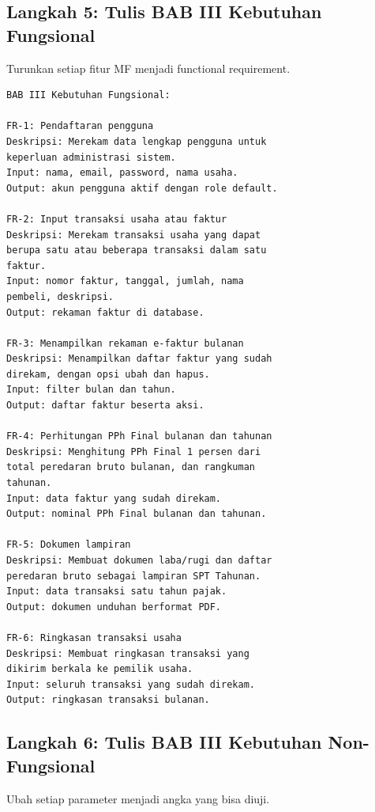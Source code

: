 \documentclass[11pt,a4paper]{article}
\begin{document}
\subsection{Langkah 5: Tulis BAB III Kebutuhan Fungsional}

Turunkan setiap fitur MF menjadi functional requirement.

\begin{lstlisting}[style=out]
BAB III Kebutuhan Fungsional:

FR-1: Pendaftaran pengguna
Deskripsi: Merekam data lengkap pengguna untuk
keperluan administrasi sistem.
Input: nama, email, password, nama usaha.
Output: akun pengguna aktif dengan role default.

FR-2: Input transaksi usaha atau faktur
Deskripsi: Merekam transaksi usaha yang dapat
berupa satu atau beberapa transaksi dalam satu
faktur.
Input: nomor faktur, tanggal, jumlah, nama
pembeli, deskripsi.
Output: rekaman faktur di database.

FR-3: Menampilkan rekaman e-faktur bulanan
Deskripsi: Menampilkan daftar faktur yang sudah
direkam, dengan opsi ubah dan hapus.
Input: filter bulan dan tahun.
Output: daftar faktur beserta aksi.

FR-4: Perhitungan PPh Final bulanan dan tahunan
Deskripsi: Menghitung PPh Final 1 persen dari
total peredaran bruto bulanan, dan rangkuman
tahunan.
Input: data faktur yang sudah direkam.
Output: nominal PPh Final bulanan dan tahunan.

FR-5: Dokumen lampiran
Deskripsi: Membuat dokumen laba/rugi dan daftar
peredaran bruto sebagai lampiran SPT Tahunan.
Input: data transaksi satu tahun pajak.
Output: dokumen unduhan berformat PDF.

FR-6: Ringkasan transaksi usaha
Deskripsi: Membuat ringkasan transaksi yang
dikirim berkala ke pemilik usaha.
Input: seluruh transaksi yang sudah direkam.
Output: ringkasan transaksi bulanan.
\end{lstlisting}

\subsection{Langkah 6: Tulis BAB III Kebutuhan Non-Fungsional}

Ubah setiap parameter menjadi angka yang bisa diuji.
\end{document}
